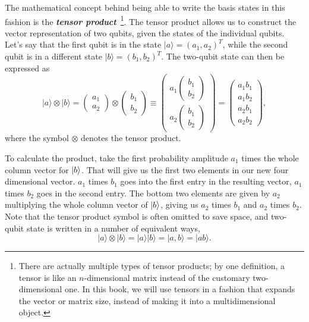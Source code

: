 The mathematical concept behind being able to write the basis states in this fashion is the \textbf{\emph{tensor product}}~\footnote{There are actually multiple types of tensor products; by one definition, a tensor is like an $n$-dimensional matrix instead of the customary two-dimensional one.  In this book, we will use tensors in a fashion that expands the vector or matrix size, instead of making it into a multidimensional object.}.
The tensor product allows us to construct the vector representation of two qubits, given the states of the individual qubits.
Let's say that the first qubit is in the state $|a\rangle=(a_1,a_2)^T$, while the second qubit is in a different state $|b\rangle=(b_1,b_2)^T$.
The two-qubit state can then be expressed as
\begin{equation}
|a\rangle \otimes|b\rangle=\left(\begin{array}{l}
a_{1} \\
a_{2}
\end{array}\right) \otimes\left(\begin{array}{l}
b_{1} \\
b_{2}
\end{array}\right) \equiv\left(\begin{array}{l}
a_{1}\left(\begin{array}{l}
b_{1} \\
b_{2}
\end{array}\right) \\
a_{2}\left(\begin{array}{l}
b_{1} \\
b_{2}
\end{array}\right)
\end{array}\right)=\left(\begin{array}{l}
a_{1} b_{1} \\
a_{1} b_{2} \\
a_{2} b_{1} \\
a_{2} b_{2}
\end{array}\right),
\label{eq:tensor_product_state}
\end{equation}
where the symbol $\otimes$ denotes the tensor product.

To calculate the product, take the first probability amplitude $a_1$ times the whole column vector for $\left| b \right\rangle$. That will give us the first two elements in our new four dimensional vector.  $a_1$ times $b_1$ goes into the first entry in the resulting vector, $a_1$ times $b_2$ goes in the second entry. The bottom two elements are given by $a_2$ multiplying the whole column vector of $\left| b \right\rangle$, giving us $a_2$ times $b_1$ and $a_2$ times $b_2$.
Note that the tensor product symbol is often omitted to save space, and two-qubit state is written in a number of equivalent ways,
\begin{equation}
    |a\rangle\otimes|b\rangle = |a\rangle|b\rangle = |a,b\rangle = |ab\rangle.
\end{equation}

